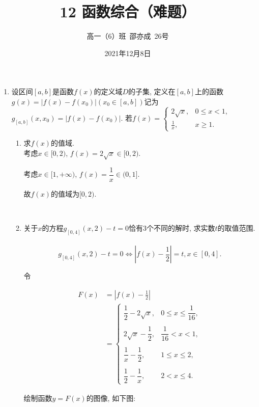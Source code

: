 \documentclass[8pt]{article}
\author{高一（6）班\ 邵亦成\ 26号}
\title{12 函数综合（难题）}
\date{2021年12月8日}
\begin{document}
	\maketitle

	\begin{enumerate}[label=\arabic*.]
		\item 设区间$[a, b]$是函数$f(x)$的定义域$D$的子集, 定义在$[a, b]$上的函数$g(x)=|f(x)-f(x_0)| (x_0 \in [a, b])$记为$g_{[a, b]}(x, x_0)=|f(x)-f(x_0)|.$ 若$f(x)=\displaystyle \left\{\begin{array}{rl}2\sqrt{x}, &0\leq x<1,\\\frac{1}{x}, &x\geq 1.\end{array}\right.$
			\begin{enumerate}[label=(\arabic*)]
				\item 求$f(x)$的值域.
					~\\

					考虑$x\in[0, 2)$, $f(x)=2\sqrt{x}\in[0, 2).$

					考虑$x\in[1, +\infty)$, $f(x)=\dfrac{1}{x}\in(0, 1]$.

					故$f(x)$的值域为$[0, 2)$.

				~\\

				\item 关于$x$的方程$g_{[0, 4]}(x, 2)-t=0$恰有3个不同的解时, 求实数$t$的取值范围.
					~\\

					$$g_{[0, 4]}(x, 2)-t=0\Leftrightarrow \left|f(x)-\frac{1}{2}\right|=t, x\in[0, 4].$$

					令

					\begin{align*}
					F(x) &= \left|f(x)-\frac{1}{2}\right|\\
					     &= \left\{\begin{array}{rl}\dfrac{1}{2}-2\sqrt{x},&0\leq x\leq \dfrac{1}{16},\\\\2\sqrt{x}-\dfrac{1}{2},&\dfrac{1}{16}<x<1,\\\\\dfrac{1}{x}-\dfrac{1}{2},&1\leq x\leq 2,\\\\\dfrac{1}{2}-\dfrac{1}{x},&2<x\leq 4.\end{array}\right.
					\end{align*}

					绘制函数$y=F(x)$的图像, 如下图:


\end{enumerate}
\end{enumerate}
\end{document}
